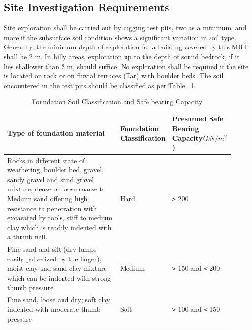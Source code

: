 \subsection{Site Investigation Requirements}
Site exploration shall be carried out by digging test pits, two as a minimum, and more if the subsurface soil condition shows a significant variation in soil type. Generally, the minimum depth of exploration for a building covered by this MRT shall be 2 m. In hilly areas, exploration up to the depth of sound bedrock, if it lies shallower than 2 m, should suffice. No exploration shall be required if the site is located on rock or on fluvial terraces (Tar) with boulder beds. The soil encountered in the test pits should be classified as per Table ~\ref{foundation-soil-classification}.
\begin{table}
  \centering
  \caption{Foundation Soil Classification and Safe bearing Capacity}
  \label{foundation-soil-classification}
  \begin{tabular}{|p{0.5\linewidth}|p{0.17\linewidth}|p{0.25\linewidth}|}
  \hline \bfseries{Type of foundation material} & \bfseries{Foundation Classification} & \bfseries{Presumed Safe Bearing Capacity($kN/m^2$)}\\
  \hline Rocks in different state of weathering, boulder bed, gravel, sandy gravel and sand gravel mixture, dense or loose coarse to Medium sand offering high resistance to penetration with excavated by tools, stiff to medium clay which is readily indented with a thumb nail. & Hard & \verb">" 200\\
  \hline Fine sand and silt (dry lumps easily pulverized by the finger), moist clay and sand clay mixture which can be indented with strong thumb pressure & Medium & \verb">" 150 and \verb"<" 200\\
  \hline Fine sand, loose and dry; soft clay indented with moderate thumb pressure & Soft & \verb">" 100 and \verb"<" 150\\
  \hline
  \end{tabular}
\end{table} 
